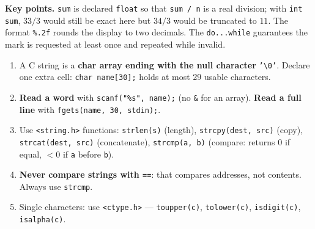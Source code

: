 \documentclass[11pt]{article}
\begin{document}
\begin{exoresolu}
\textbf{Key points.} \texttt{sum} is declared \texttt{float} so that \texttt{sum / n} is a real division; with \texttt{int sum}, $33/3$ would still be exact here but $34/3$ would be truncated to $11$. The format \texttt{\%.2f} rounds the display to two decimals. The \texttt{do...while} guarantees the mark is requested at least once and repeated while invalid.
\end{exoresolu}

\begin{methode}
\begin{enumerate}
\item A C string is a \textbf{char array ending with the null character} \texttt{'\textbackslash 0'}. Declare one extra cell: \texttt{char name[30];} holds at most 29 usable characters.
\item \textbf{Read a word} with \texttt{scanf("\%s", name);} (no \texttt{\&} for an array). \textbf{Read a full line} with \texttt{fgets(name, 30, stdin);}.
\item Use \texttt{<string.h>} functions: \texttt{strlen(s)} (length), \texttt{strcpy(dest, src)} (copy), \texttt{strcat(dest, src)} (concatenate), \texttt{strcmp(a, b)} (compare: returns $0$ if equal, $<0$ if \texttt{a} before \texttt{b}).
\item \textbf{Never compare strings with \texttt{==}}: that compares addresses, not contents. Always use \texttt{strcmp}.
\item Single characters: use \texttt{<ctype.h>} — \texttt{toupper(c)}, \texttt{tolower(c)}, \texttt{isdigit(c)}, \texttt{isalpha(c)}.
\end{enumerate}
\end{methode}
\end{document}
